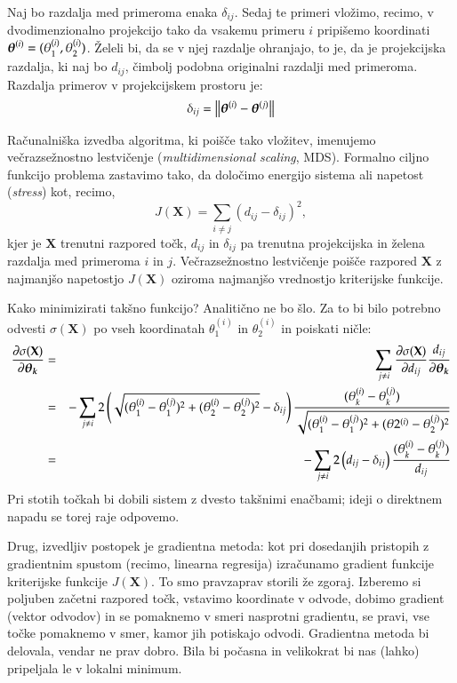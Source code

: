 Naj bo razdalja med primeroma enaka $\delta_{ij}$. Sedaj te primeri vložimo, recimo, v dvodimenzionalno projekcijo tako da vsakemu primeru $i$ pripišemo koordinati $\boldsymbol{\theta}^{(i)}=(\theta_1^{(i)},\theta_2^{(i)})$. Želeli bi, da se v njej razdalje ohranjajo, to je, da je projekcijska razdalja, ki naj bo $d_{ij}$, čimbolj podobna originalni razdalji med primeroma. Razdalja primerov v projekcijskem prostoru je:
$$\delta_{ij}=\left\lVert{\boldsymbol{\theta}}^{(i)}-\boldsymbol{\theta}^{(j)}\right\rVert$$

Računalniška izvedba algoritma, ki poišče tako vložitev, imenujemo večrazsežnostno lestvičenje ({\em multidimensional scaling}, MDS). Formalno ciljno funkcijo problema zastavimo tako, da določimo energijo sistema ali napetost ({\em stress}) kot, recimo,
$$J(\mathbf{X}) = \sum_{i\ne j} (d_{ij} - \delta_{ij})^2,$$
kjer je $\mathbf{X}$ trenutni razpored točk, $d_{ij}$ in $\delta_{ij}$ pa trenutna projekcijska in želena razdalja med primeroma $i$ in $j$. Večrazsežnostno lestvičenje poišče razpored $\mathbf{X}$ z najmanjšo napetostjo $J(\mathbf{X})$ oziroma najmanjšo vrednostjo kriterijske funkcije.

Kako minimizirati takšno funkcijo? Analitično ne bo šlo. Za to bi bilo potrebno odvesti $\sigma(\mathbf{X})$ po vseh koordinatah $\theta_1^{(i)}$ in $\theta_2^{(i)}$ in poiskati ničle:
\begin{eqnarray}
  \frac{\partial\sigma({\mathbf{X}})}{\partial \boldsymbol{\theta_k}} & = &
  \sum_{j\ne i} \frac{\partial\sigma({\mathbf{X}})}{\partial d_{ij}}\frac{d_{ij}}{\partial \boldsymbol{\theta_k}} \nonumber \\
  & = & - \sum_{j\ne i} 2\left(\sqrt{(\theta_1^{(i)}-\theta_1^{(j)})^2+(\theta_2^{(i)}-\theta_2^{(j)})^2}-\delta_{ij}\right) \frac{(\theta_k^{(i)}-\theta_k^{(j)})}{\sqrt{(\theta_1^{(i)}-\theta_1^{(j)})^2+(\theta2^{(i)}-\theta_2^{(j)})^2}} \nonumber \\
& = & - \sum_{j\ne i} 2\left(d_{ij}-\delta_{ij}\right) \frac{(\theta_k^{(i)}-\theta_k^{(j)})}{d_{ij}} \label{eq:mds-grad}
\end{eqnarray}
Pri stotih točkah bi dobili sistem z dvesto takšnimi enačbami; ideji o direktnem napadu se torej raje odpovemo.

Drug, izvedljiv postopek je gradientna metoda: kot pri dosedanjih pristopih z gradientnim spustom (recimo, linearna regresija) izračunamo gradient funkcije kriterijske funkcije $J(\mathbf{X})$. To smo pravzaprav storili že zgoraj. Izberemo si poljuben začetni razpored točk, vstavimo koordinate v odvode, dobimo gradient (vektor odvodov) in se pomaknemo v smeri nasprotni gradientu, se pravi, vse točke pomaknemo v smer, kamor jih potiskajo odvodi. Gradientna metoda bi delovala, vendar ne prav dobro. Bila bi počasna in velikokrat bi nas (lahko) pripeljala le v lokalni minimum.

